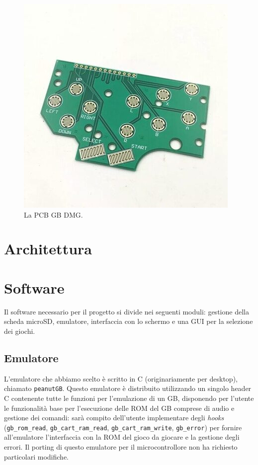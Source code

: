 \documentclass[hidelinks,12pt]{article}
\begin{document}
\begin{figure}[h]
	\begin{center}
		\includegraphics[scale=0.4]{figures/pcb.jpeg}
	\end{center}
	\caption{La PCB GB DMG.}
	\label{fig:pcb}
\end{figure}


\section{Architettura}

\section{Software}
Il software necessario per il progetto si divide nei seguenti moduli: gestione
della scheda microSD, emulatore, interfaccia con lo schermo e una GUI per la
selezione dei giochi.

\subsection{Emulatore}
L'emulatore che abbiamo scelto è scritto in C (originariamente per desktop),
chiamato \texttt{peanutGB}. Questo emulatore è distribuito utilizzando un
singolo header C contenente tutte le funzioni per l'emulazione di un GB,
disponendo per l'utente le funzionalità base per l'esecuzione delle ROM del GB
comprese di audio e gestione dei comandi: sarà compito dell'utente implementare
degli \textit{hooks} (\texttt{gb\_rom\_read}, \texttt{gb\_cart\_ram\_read},
\texttt{gb\_cart\_ram\_write}, \texttt{gb\_error}) per fornire all'emulatore
l'interfaccia con la  ROM del gioco da giocare e la gestione degli errori. Il
porting di questo emulatore per il microcontrollore non ha richiesto particolari
modifiche.
\end{document}
